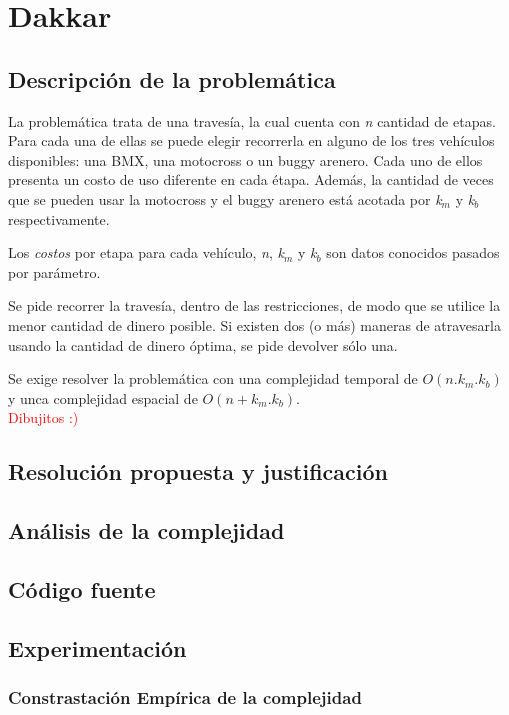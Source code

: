 \section{Dakkar}
\subsection{Descripci\'on de la problem\'atica}
La problem\'atica trata de una traves\'ia, la cual cuenta con \emph{n} cantidad de etapas. Para cada una de ellas se puede elegir recorrerla en alguno de los tres veh\'iculos disponibles: una BMX, una motocross o un buggy arenero. Cada uno de ellos presenta un costo de uso diferente en cada \'etapa. Adem\'as, la cantidad de veces que se pueden usar la motocross y el buggy arenero est\'a acotada por \emph{k}$_m$ y \emph{k}$_b$ respectivamente.

Los \emph{costos} por etapa para cada veh\'iculo, \emph{n}, \emph{k}$_m$ y \emph{k}$_b$ son datos conocidos pasados por par\'ametro.

Se pide recorrer la traves\'ia, dentro de las restricciones, de modo que se utilice la menor cantidad de dinero posible. Si existen dos (o m\'as) maneras de atravesarla usando la cantidad de dinero \'optima, se pide devolver s\'olo una.

Se exige resolver la problem\'atica con una complejidad temporal de $O(n.k_m.k_b)$ y unca complejidad espacial de $O(n+k_m.k_b)$.\\

\textcolor{red}{Dibujitos :)}

\subsection{Resoluci\'on propuesta y justificaci\'on}
\subsection{An\'alisis de la complejidad}
\subsection{C\'odigo fuente}
\subsection{Experimentaci\'on}

\subsubsection{Constrastaci\'on Emp\'irica de la complejidad}